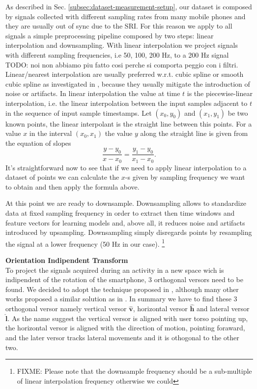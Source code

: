 As described in Sec. \ref{subsec:dataset-measurement-setup}, our
dataset is composed by signals collected with different sampling rates
from many mobile phones and they are usually out of sync due to the
SRI. For this reason we apply to all signals a
simple preprocessing pipeline composed by two steps: linear
interpolation and downsampling. With linear interpolation we project
signals with different sampling frequencies, i.e 50, 100, 200 Hz, to a
200 Hz signal TODO: noi non abbiamo piu fatto cosi perche si comporta peggio con i filtri. Linear/nearest interpolation are usually preferred
w.r.t. cubic spline or smooth cubic spline as investigated in
\cite{stisen2015smart}, because they usually mitigate the introduction
of noise or artifacts. In linear interpolation the value at time $t$
is the piecewise-linear interpolation, i.e. the linear interpolation
between the input samples adjacent to $t$ in the sequence of input
sample timestamps. Let $(x_0, y_0)$ and $(x_1, y_1)$ be two known
points, the linear interpolant is the straight line between this
points. For a value $x$ in the interval $(x_0, x_1)$ the value $y$
along the straight line is given from the equation of slopes
\begin{equation}
  \label{eq:linear-interpolation}
  \frac{y - y_0}{x - x_0} = \frac{y_1 - y_0}{x_1 - x_0}.
\end{equation}
It's straightforward now to see that if we need to apply linear
interpolation to a dataset of points we can calculate the \mbox{$x$-s} given
by sampling frequency we want to obtain and then apply the formula
above.

At this point we are ready to downsample. Downsampling allows to
standardize data at fixed sampling frequency in order to extract then
time windows and feature vectors for learning models and, above all,
it reduces noise and artifacts introduced by upsampling. Downsampling
simply disregards points by resampling the signal at a lower frequency
(50 Hz in our case). \footnote{FIXME: Please note that the downsample
  frequency should be a sub-multiple of linear interpolation frequency
  otherwise we could}

\textbf{Orientation Indipendent Transform}\\
To project the signals acquired during an activity in a new space wich is indipendent of the rotation of the smartphone, 3 orthogonal versors need to be found. We decided to adopt the technique proposed in \cite{gadaleta2018idnet}, although many other works proposed a similar solution as in \cite{kunze2009way, henpraserttae2011accurate}. In summary we have to find these 3 orthogonal versor namely vertical versor $\boldsymbol{\hat{v}}$, horizontal versor $\boldsymbol{\hat{h}}$ and lateral versor $\boldsymbol{\hat{l}}$. As the name suggest the vertical versor is aligned with user torso pointing up, the horizontal versor is aligned with the direction of motion, pointing foraward, and the later versor tracks lateral movements and it is othogonal to the other two.

